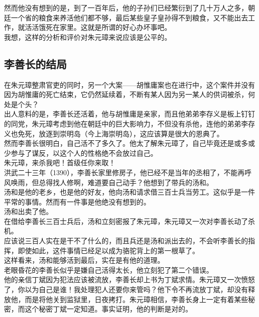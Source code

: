 \begin{multicols}{\theparacolNo}
然而他没有想到的是，到了一百年后，他的子孙们已经繁衍到了几十万人之多，朝廷一个省的粮食来养活他们都不够，最后某些皇子皇孙得不到粮食，又不能出去工作，就活活饿死在家里。这就是所谓的好心办坏事吧。\\

我想，这样的分析和评价对朱元璋来说应该是公平的。\\

\subsection{李善长的结局}
在朱元璋整肃官吏的同时，另一个大案——胡惟庸案也在进行中，这个案件并没有因为胡惟庸的死亡结束，它仍然延续着，不断有某人因为另一某人的供词被杀，何处是个头？\\

出人意料的是，李善长还活着，他与胡惟庸是亲家，而且他弟弟李存义是板上钉钉的同党，朱元璋考虑到他在朝廷中的巨大影响力，不但没有杀他，连他的弟弟李存义也免死，放逐到崇明岛（今上海崇明岛），这应该算是很大的恩典了。\\

然而李善长很明白，自己活不了多久了。他太了解朱元璋了，自己毕竟还是或多或少参与了谋反，以这个人的性格绝不会放过自己。\\

朱元璋，来杀我吧！首级任你来取！\\

洪武二十三年（1390），李善长家里修房子，他已经不是当年的丞相了，不能再呼风唤雨，但总得找人修啊，难道要自己动手？他想到了带兵的汤和。\\

汤和是他的老乡，也是他的好友，他向汤和请求借三百士兵当劳工。这似乎是一件平常的事情。然而有一件事是他绝没有想到的。\\

汤和出卖了他。\\

在借给李善长三百士兵后，汤和立刻密报了朱元璋，朱元璋又一次对李善长动了杀机。\\

应该说三百人实在是干不了什么的，而且兵还是汤和派出去的，不会听李善长的指挥，即使如此，这件事情已经足以成为骆驼背上的第一根草了。\\

这样看来，汤和能够活到最后，实在是有他的道理。\\

老眼昏花的李善长似乎是嫌自己活得太长，他立刻犯了第二个错误。\\

他的亲信丁斌因为犯法应该被流放，李善长却上书为丁斌求情。朱元璋又一次愤怒了，你以为自己是谁！我处理犯人还要你来管吗？他下令不再流放丁斌，却没有释放他，而是将他关到监狱里，日夜拷打。朱元璋相信，李善长身上一定有着某些秘密，而这个秘密丁斌一定知道。事实证明，他的判断是对的。\\


\end{multicols}
